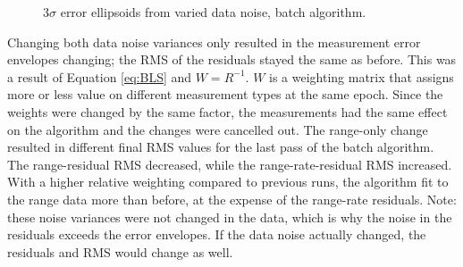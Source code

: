 \documentclass[]{aiaa-tc}%
\begin{document}
	\begin{figure}[H]
		\centering
		\caption{3$\sigma$ error ellipsoids from varied data noise, batch algorithm. }
		\label{fig:ErrorEll_DN}
	\end{figure}	

	Changing both data noise variances only resulted in the measurement error envelopes changing; the RMS of the residuals stayed the same as before.  This was a result of Equation \ref{eq:BLS} and $W=R^{-1}$. $W$ is a weighting matrix that assigns more or less value on different measurement types at the same epoch.  Since the weights were changed by the same factor, the measurements had the same effect on the algorithm and the changes were cancelled out. The range-only change resulted in different final RMS values for the last pass of the batch algorithm.  The range-residual RMS decreased, while the range-rate-residual RMS increased. With a higher relative weighting compared to previous runs, the algorithm fit to the range data more than before, at the expense of the range-rate residuals.  Note: these noise variances were not changed in the data, which is why the noise in the residuals exceeds the error envelopes.  If the data noise actually changed, the residuals and RMS would change as well.
	
\end{document}
